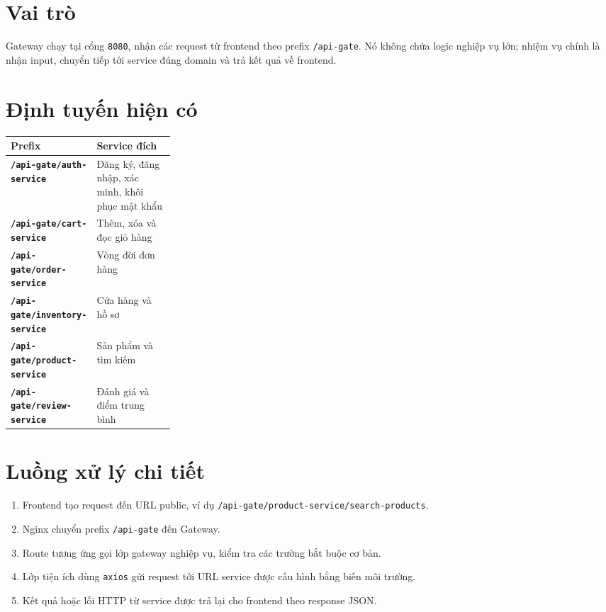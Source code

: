 \documentclass[12pt]{article}
\begin{document}

\section{Vai trò}
Gateway chạy tại cổng \texttt{8080}, nhận các request từ frontend theo prefix \texttt{/api-gate}. Nó không chứa logic nghiệp vụ lớn; nhiệm vụ chính là nhận input, chuyển tiếp tới service đúng domain và trả kết quả về frontend.

\section{Định tuyến hiện có}
\begin{tabularx}{\linewidth}{>{\bfseries}p{0.27\linewidth} X}
\toprule
Prefix & Service đích \\
\midrule
\texttt{/api-gate/auth-service} & Đăng ký, đăng nhập, xác minh, khôi phục mật khẩu \\
\texttt{/api-gate/cart-service} & Thêm, xóa và đọc giỏ hàng \\
\texttt{/api-gate/order-service} & Vòng đời đơn hàng \\
\texttt{/api-gate/inventory-service} & Cửa hàng và hồ sơ \\
\texttt{/api-gate/product-service} & Sản phẩm và tìm kiếm \\
\texttt{/api-gate/review-service} & Đánh giá và điểm trung bình \\
\bottomrule
\end{tabularx}

\section{Luồng xử lý chi tiết}
\begin{enumerate}
  \item Frontend tạo request đến URL public, ví dụ \texttt{/api-gate/product-service/search-products}.
  \item Nginx chuyển prefix \texttt{/api-gate} đến Gateway.
  \item Route tương ứng gọi lớp gateway nghiệp vụ, kiểm tra các trường bắt buộc cơ bản.
  \item Lớp tiện ích dùng \texttt{axios} gửi request tới URL service được cấu hình bằng biến môi trường.
  \item Kết quả hoặc lỗi HTTP từ service được trả lại cho frontend theo response JSON.
\end{enumerate}
\end{document}
